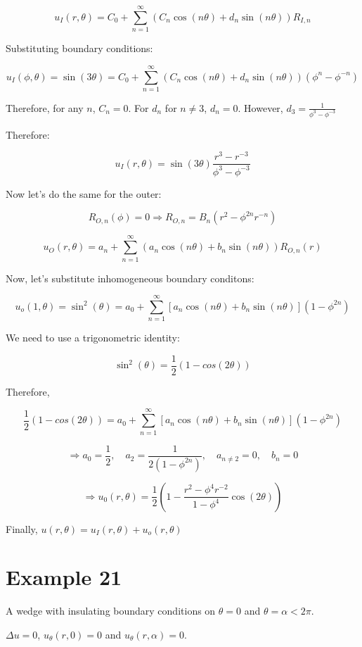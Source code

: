 \documentclass{article}
\begin{document}
$$u_I (r, \theta) = C_0 + \sum_{n=1}^\infty \left( C_n \cos (n \theta) + d_n \sin (n \theta) \right) R_{I,n}$$

Substituting boundary conditions:

$$u_{I}(\phi, \theta) = \sin(3 \theta) = C_0 + \sum_{n=1}^\infty \left( C_n \cos(n \theta) + d_n \sin(n \theta) \right) \left(\phi^n - \phi^{-n} \right)$$

Therefore, for any $n$, $C_n = 0$. For $d_n$ for $n \neq 3$, $d_n = 0$. However, $d_3 = \frac{1}{\phi^3 - \phi^{-3}}$

Therefore:

$$u_I(r, \theta) = \sin(3 \theta) \frac{r^3 - r^{-3}}{\phi^3 - \phi^{-3}}$$

Now let's do the same for the outer:

$$R_{O, n} (\phi) = 0 \Rightarrow R_{O,n} = B_n \left(r^2 - \phi^{2n} r^{-n} \right)$$

$$u_O (r, \theta) = a_n + \sum_{n=1}^\infty (a_n \cos (n \theta) + b_n \sin(n \theta)) R_{O, n} (r)$$

Now, let's substitute inhomogeneous boundary conditons:

$$u_o (1, \theta) = \sin^2  (\theta) = a_0 + \sum_{n=1}^\infty \left[ a_n \cos(n \theta) + b_n \sin(n \theta) \right] (1 - \phi^{2n})$$

We need to use a trigonometric identity:

$$\sin^2  (\theta) = \frac{1}{2} \left(1 - cos (2 \theta) \right)$$

Therefore, 

$$\frac{1}{2} \left(1 - cos (2 \theta) \right) =  a_0 + \sum_{n=1}^\infty \left[ a_n \cos(n \theta) + b_n \sin(n \theta) \right] (1 - \phi^{2n})$$

$$\Rightarrow a_0 = \frac{1}{2}, \quad a_2 = \frac{1}{2 (1 - \phi^{2n})}, \quad a_{n \neq 2} = 0, \quad b_n = 0$$

$$\Rightarrow u_0 (r, \theta) = \frac{1}{2} \left( 1 - \frac{r^2 - \phi^4 r^{-2}}{1 - \phi^4} \cos(2 \theta) \right)$$

Finally, $u(r, \theta) = u_I (r, \theta) + u_o (r, \theta)$

\section{Example 21}

A wedge with insulating boundary conditions on $\theta = 0$ and $\theta = \alpha < 2 \pi$. 

$\Delta u = 0$, $u_\theta (r,0) = 0$ and $u_\theta (r, \alpha) = 0$. 
\end{document}
